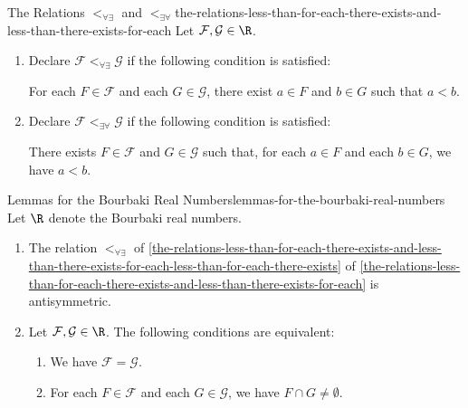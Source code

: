 \begin{definition}{The Relations $\lt_{\forall\exists}$ and $\lt_{\exists\forall}$}{the-relations-less-than-for-each-there-exists-and-less-than-there-exists-for-each}%
    Let $\mathcal{F},\mathcal{G}\in\R$.
    \begin{enumerate}
        \item\label{the-relations-less-than-for-each-there-exists-and-less-than-there-exists-for-each-less-than-for-each-there-exists}Declare $\mathcal{F}\lt_{\forall\exists}\mathcal{G}$ if the following condition is satisfied:
            \begin{itemize}
                \itemstar For each $F\in\mathcal{F}$ and each $G\in\mathcal{G}$, there exist $a\in F$ and $b\in G$ such that $a\lt b$.
            \end{itemize}
        \item\label{the-relations-less-than-for-each-there-exists-and-less-than-there-exists-for-each-less-than-there-exists-for-each}Declare $\mathcal{F}\lt_{\exists\forall}\mathcal{G}$ if the following condition is satisfied:
            \begin{itemize}
                \itemstar There exists $F\in\mathcal{F}$ and $G\in\mathcal{G}$ such that, for each $a\in F$ and each $b\in G$, we have $a\lt b$.
            \end{itemize}
    \end{enumerate}
\end{definition}
\begin{lemma}{Lemmas for the Bourbaki Real Numbers}{lemmas-for-the-bourbaki-real-numbers}%
    Let $\R$ denote the Bourbaki real numbers.
    \begin{enumerate}
        \item\label{lemmas-for-the-bourbaki-real-numbers-antisymmetry-of-less-than-for-each-there-exists}The relation $\lt_{\forall\exists}$ of \cref{the-relations-less-than-for-each-there-exists-and-less-than-there-exists-for-each-less-than-for-each-there-exists} of \cref{the-relations-less-than-for-each-there-exists-and-less-than-there-exists-for-each} is antisymmetric.
        \item\label{lemmas-for-the-bourbaki-real-numbers-an-equality-criterion-for-bourbaki-real-numbers}Let $\mathcal{F},\mathcal{G}\in\R$. The following conditions are equivalent:
            \begin{enumerate}
                \item\label{lemmas-for-the-bourbaki-real-numbers-an-equality-criterion-for-bourbaki-real-numbers-1}We have $\mathcal{F}=\mathcal{G}$.
                \item\label{lemmas-for-the-bourbaki-real-numbers-an-equality-criterion-for-bourbaki-real-numbers-2}For each $F\in\mathcal{F}$ and each $G\in\mathcal{G}$, we have $F\cap G\neq\emptyset$.
            \end{enumerate}
    \end{enumerate}
\end{lemma}
